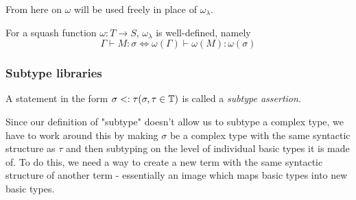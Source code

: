\documentclass[main.tex]{subfiles}
\begin{document}
From here on $\omega$ will be used freely in place of $\omega_{\lambda}$.

\begin{prop}
    For a squash function $\omega: T \rightarrow S$, $\omega_{\lambda}$ is
    well-defined, namely
    \[ \Gamma \vdash M : \sigma \iff \omega(\Gamma) \vdash \omega(M) : \omega(\sigma) \]
\end{prop}

\subsubsection{Subtype libraries}
\begin{defn}
    A statement in the form $\sigma <: \tau (\sigma, \tau \in \mathbb{T})$
    is called a \emph{subtype assertion}.
\end{defn}

Since our definition of "subtype" doesn't allow us to subtype a complex type,
we have to work around this by making $\sigma$ be a complex type with the same
syntactic structure as $\tau$ and then subtyping on the level of individual
basic types it is made of. To do this, we need a way to create a new term
with the same syntactic structure of another term - essentially an image which
maps basic types into new basic types.

\end{document}

